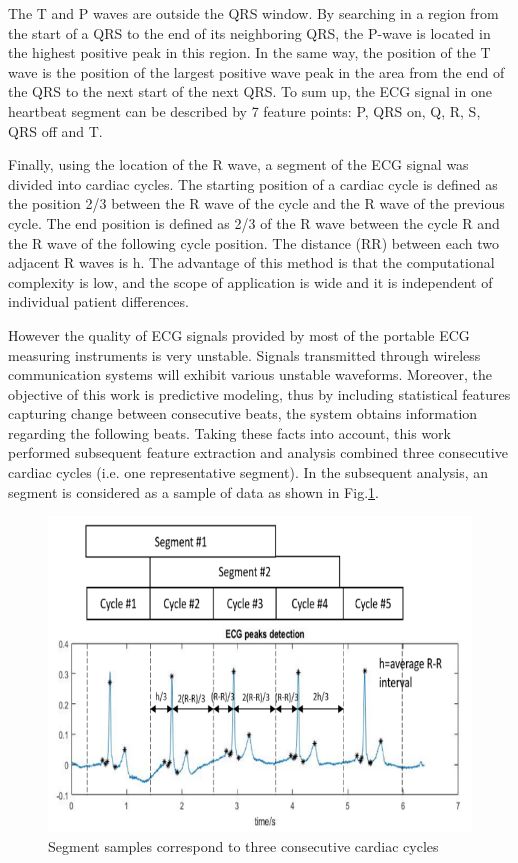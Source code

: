 The T and P waves are outside the QRS window. By searching in a region from the start of a QRS to the end of its neighboring QRS, the P-wave is located in the highest positive peak in this region. In the same way, the position of the T wave is the position of the largest positive wave peak in the area from the end of the QRS to the next start of the next QRS. To sum up, the ECG signal in one heartbeat segment can be described by 7 feature points: P, QRS on, Q, R, S, QRS off and T. 

Finally, using the location of the R wave, a segment of the ECG signal was divided into cardiac cycles. The starting position of a cardiac cycle is defined as the position 2/3 between the R wave of the cycle and the R wave of the previous cycle. The end position is defined as 2/3 of the R wave between the cycle R and the R wave of the following cycle position. The distance (RR) between each two adjacent R waves is h. The advantage of this method is that the computational complexity is low, and the scope of application is wide and it is independent of individual patient differences. 

However the quality of ECG signals provided by most of the portable ECG measuring instruments is very unstable. Signals transmitted through wireless communication systems will exhibit various unstable waveforms. Moreover, the objective of this work is predictive modeling, thus by including statistical features capturing change between consecutive beats, the system obtains information regarding the following beats. Taking these facts into account, this work performed subsequent feature extraction and analysis combined three consecutive cardiac cycles (i.e. one representative segment). In the subsequent analysis, an segment is considered as a sample of data as shown in Fig.\ref{fig:interval}.

\begin{figure}[t]
\centering
\includegraphics[scale=.8]{Fig/segment.png}
\caption{Segment samples correspond to three consecutive cardiac cycles}
\label{fig:interval}
\end{figure}


